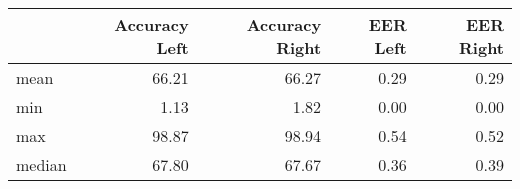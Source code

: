 \begin{tabular}{lrrrr}
\toprule
{} &  Accuracy Left &  Accuracy Right &  EER Left &  EER Right \\
\midrule
mean   &          66.21 &           66.27 &      0.29 &       0.29 \\
min    &           1.13 &            1.82 &      0.00 &       0.00 \\
max    &          98.87 &           98.94 &      0.54 &       0.52 \\
median &          67.80 &           67.67 &      0.36 &       0.39 \\
\bottomrule
\end{tabular}
